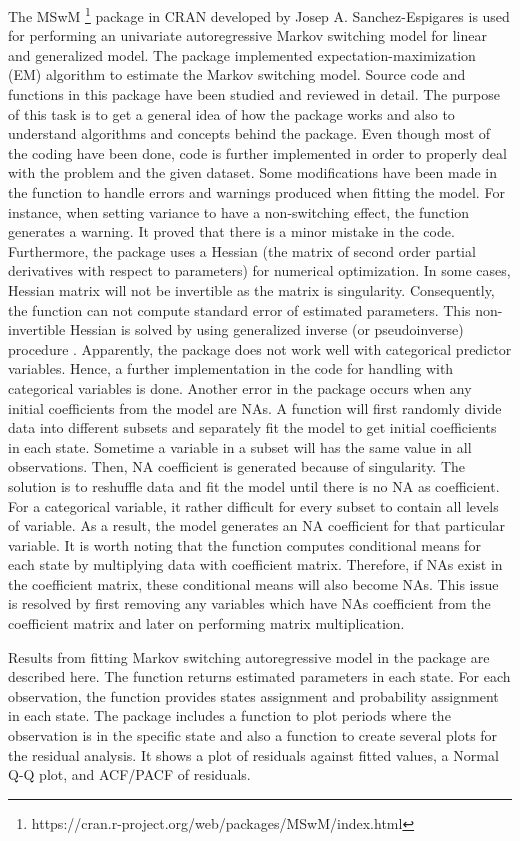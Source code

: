 \documentclass[]{article}
\begin{document}
The MSwM \footnote{https://cran.r-project.org/web/packages/MSwM/index.html} package in CRAN developed by Josep A. Sanchez-Espigares is used for performing an univariate autoregressive Markov switching model for linear and generalized model. The package implemented expectation-maximization (EM) algorithm to estimate the Markov switching model. Source code and functions in this package have been studied and reviewed in detail. The purpose of this task is to get a general idea of how the package works and also to understand algorithms and concepts behind the package. Even though most of the coding have been done, code is further implemented in order to properly deal with the problem and the given dataset. Some modifications have been made in the function to handle errors and warnings produced when fitting the model. For instance, when setting variance to have a non-switching effect, the function generates a warning. It proved that there is a minor mistake in the code. Furthermore, the package uses a Hessian (the matrix of second order partial derivatives with respect to parameters) for numerical optimization. In some cases, Hessian matrix will not be invertible as the matrix is singularity. Consequently, the function can not compute standard error of estimated parameters. This non-invertible Hessian is solved by using generalized inverse (or pseudoinverse) procedure \cite{gill2004your}. Apparently, the package does not work well with categorical predictor variables. Hence, a further implementation in the code for handling with categorical variables is done. Another error in the package occurs when any initial coefficients from the model are NAs. A function will first randomly divide data into different subsets and separately fit the model to get initial coefficients in each state. Sometime a variable in a subset will has the same value in all observations. Then, NA coefficient is generated because of singularity. The solution is to reshuffle data and fit the model until there is no NA as coefficient. For a categorical variable, it rather difficult for every subset to contain all levels of variable. As a result, the model generates an NA coefficient for that particular variable. It is worth noting that the function computes conditional means for each state by multiplying data with coefficient matrix. Therefore, if NAs exist in the coefficient matrix, these conditional means will also become NAs. This issue is resolved by first removing any variables which have NAs coefficient from the coefficient matrix and later on performing matrix multiplication. 

Results from fitting Markov switching autoregressive model in the package are described here. The function returns estimated parameters in each state. For each observation, the function provides states assignment and probability assignment in each state. The package includes a function to plot periods where the observation is in the specific state and also a function to create several plots for the residual analysis. It shows a plot of residuals against fitted values, a Normal Q-Q plot, and ACF/PACF of residuals.



\end{document}
